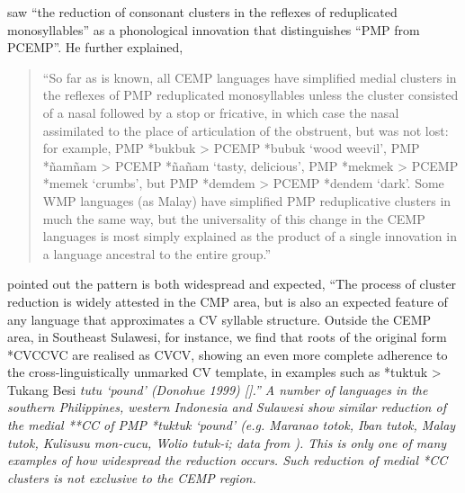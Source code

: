 \citet[246]{Blust1993} saw “the reduction of consonant clusters
in the reflexes of reduplicated monosyllables” as a phonological
innovation that distinguishes “PMP from PCEMP”.
He further explained, 

\begin{quote}
		“So far as is known,
		all CEMP languages have simplified medial clusters in the reflexes
		of PMP reduplicated monosyllables unless the cluster consisted
		of a nasal followed by a stop or fricative,
		in which case the nasal assimilated to the place of articulation
		of the obstruent, but was not lost: for example,
		PMP *bukbuk > PCEMP *bubuk ‘wood weevil’,
		PMP *ñamñam > PCEMP *ñañam ‘tasty,
		delicious’, PMP *mekmek > PCEMP *memek ‘crumbs’,
		but PMP *demdem > PCEMP *dendem ‘dark’.
		Some WMP languages (as Malay) have simplified PMP reduplicative
		clusters in much the same way,
		but the universality of this change in the CEMP languages is
		most simply explained as the product of a single innovation in
		a language ancestral to the entire group.” \citep[246]{Blust1993}
\end{quote}

\citet[134]{DonohueGrimes2008} pointed out the pattern is both
widespread and expected, “The process of cluster reduction is widely attested
in the CMP area,
but is also an expected feature of any language that approximates
a CV syllable structure.
Outside the CEMP area,
in Southeast Sulawesi, for instance,
we find that roots of the original form
*CVCCVC are realised
as CVCV,
showing an even more complete adherence to the cross-linguistically
unmarked CV template, in examples such as
*tuktuk > Tukang Besi \it{tutu} ‘pound’ (Donohue 1999) [\citealp{Donohue1999a}].”
A number of languages in the southern Philippines,
western Indonesia and Sulawesi show similar reduction of the
medial **CC of PMP *tuktuk ‘pound’ (e.g.
Maranao \it{totok}, Iban \it{tutok},
Malay \it{tutok}, Kulisusu \it{mon-cucu},
Wolio \it{tutuk-i}; data from \citealp{BlustTrussel2020}).
This is only one of many examples of how widespread the reduction occurs.
Such reduction of medial *CC clusters is not exclusive to the CEMP region.


